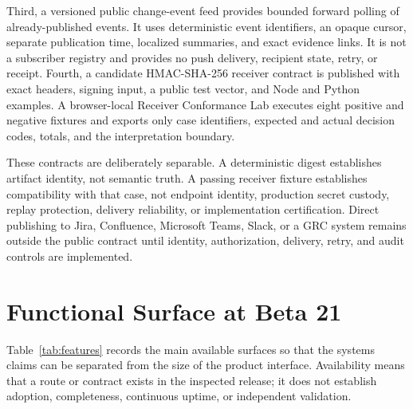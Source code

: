 \documentclass[11pt]{article}
\begin{document}
Third, a versioned public change-event feed provides bounded forward polling of
already-published events. It uses deterministic event identifiers, an opaque
cursor, separate publication time, localized summaries, and exact evidence
links. It is not a subscriber registry and provides no push delivery, recipient
state, retry, or receipt. Fourth, a candidate HMAC-\allowbreak SHA-256 receiver contract is
published with exact headers, signing input, a public test vector, and Node and
Python examples. A browser-local Receiver Conformance Lab executes eight
positive and negative fixtures and exports only case identifiers, expected and
actual decision codes, totals, and the interpretation boundary.

These contracts are deliberately separable. A deterministic digest establishes
artifact identity, not semantic truth. A passing receiver fixture establishes
compatibility with that case, not endpoint identity, production secret custody,
replay protection, delivery reliability, or implementation certification.
Direct publishing to Jira, Confluence, Microsoft Teams, Slack, or a GRC system
remains outside the public contract until identity, authorization, delivery,
retry, and audit controls are implemented.

\section{Functional Surface at Beta 21}
\label{sec:features}

Table~\ref{tab:features} records the main available surfaces so that the systems
claims can be separated from the size of the product interface. Availability
means that a route or contract exists in the inspected release; it does not
establish adoption, completeness, continuous uptime, or independent validation.
\end{document}
